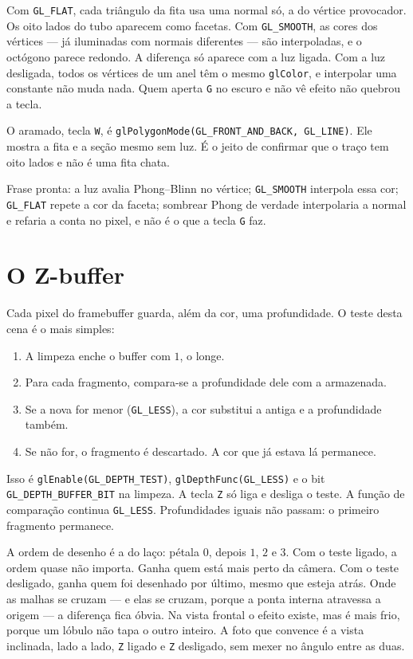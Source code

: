 \documentclass[11pt,a4paper]{article}
\newcommand{\fn}[1]{\texttt{\nobreak\hspace{0pt}#1}}
\begin{document}
Com \fn{GL\_FLAT}, cada triângulo da fita usa uma normal só, a do vértice provocador. Os oito lados do tubo aparecem como facetas. Com \fn{GL\_SMOOTH}, as cores dos vértices --- já iluminadas com normais diferentes --- são interpoladas, e o octógono parece redondo. A diferença só aparece com a luz ligada. Com a luz desligada, todos os vértices de um anel têm o mesmo \fn{glColor}, e interpolar uma constante não muda nada. Quem aperta \fn{G} no escuro e não vê efeito não quebrou a tecla.

O aramado, tecla \fn{W}, é \fn{glPolygonMode(GL\_FRONT\_AND\_BACK, GL\_LINE)}. Ele mostra a fita e a seção mesmo sem luz. É o jeito de confirmar que o traço tem oito lados e não é uma fita chata.

\begin{voz}
Frase pronta: a luz avalia Phong--Blinn no vértice; \fn{GL\_SMOOTH} interpola essa cor; \fn{GL\_FLAT} repete a cor da faceta; sombrear Phong de verdade interpolaria a normal e refaria a conta no pixel, e não é o que a tecla \fn{G} faz.
\end{voz}

\section{O Z-buffer}
\label{sec:z}

Cada pixel do framebuffer guarda, além da cor, uma profundidade. O teste desta cena é o mais simples:

\begin{enumerate}
\item A limpeza enche o buffer com \(1\), o longe.
\item Para cada fragmento, compara-se a profundidade dele com a armazenada.
\item Se a nova for menor (\fn{GL\_LESS}), a cor substitui a antiga e a profundidade também.
\item Se não for, o fragmento é descartado. A cor que já estava lá permanece.
\end{enumerate}

Isso é \fn{glEnable(GL\_DEPTH\_TEST)}, \fn{glDepthFunc(GL\_LESS)} e o bit \fn{GL\_DEPTH\_BUFFER\_BIT} na limpeza. A tecla \fn{Z} só liga e desliga o teste. A função de comparação continua \fn{GL\_LESS}. Profundidades iguais não passam: o primeiro fragmento permanece.

A ordem de desenho é a do laço: pétala \(0\), depois \(1\), \(2\) e \(3\). Com o teste ligado, a ordem quase não importa. Ganha quem está mais perto da câmera. Com o teste desligado, ganha quem foi desenhado por último, mesmo que esteja atrás. Onde as malhas se cruzam --- e elas se cruzam, porque a ponta interna atravessa a origem --- a diferença fica óbvia. Na vista frontal o efeito existe, mas é mais frio, porque um lóbulo não tapa o outro inteiro. A foto que convence é a vista inclinada, lado a lado, \fn{Z} ligado e \fn{Z} desligado, sem mexer no ângulo entre as duas.
\end{document}
